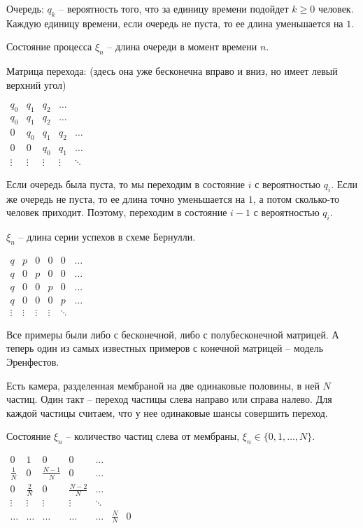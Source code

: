 \begin{exmp}
Очередь: $q_k$ -- вероятность того, что за единицу времени подойдет $k \geq 0$ человек. 
Каждую единицу времени, если очередь не пуста, то ее длина уменьшается на $1$.

Состояние процесса $\xi_n$ -- длина очереди в момент времени $n$.

Матрица перехода: (здесь она уже бесконечна вправо и вниз, но имеет левый верхний угол)

$\begin{matrix}
q_0    & q_1    & q_2    & \dots \\
q_0    & q_1    & q_2    & \dots \\
0      & q_0    & q_1    & q_2 & \dots \\
0      & 0      & q_0    & q_1 & \dots \\
\vdots & \vdots & \vdots & \vdots & \ddots
\end{matrix}$

Если очередь была пуста, то мы переходим в состояние $i$ с вероятностью $q_i$.
Если же очередь не пуста, то ее длина точно уменьшается на $1$, а потом сколько-то человек приходит.
Поэтому, переходим в состояние $i-1$ с вероятностью $q_i$.
\end{exmp}

\begin{exmp}
$\xi_n$ -- длина серии успехов в схеме Бернулли.

$\begin{matrix}
q & p & 0 & 0 & 0 & \dots  \\
q & 0 & p & 0 & 0 & \dots \\
q & 0 & 0 & p & 0 & \dots \\
q & 0 & 0 & 0 & p & \dots \\
\vdots & \vdots & \vdots & \vdots & \ddots
\end{matrix}$
\end{exmp}

\begin{exmp}
Все примеры были либо с бесконечной, либо с полубесконечной матрицей. 
А теперь один из самых известных примеров с конечной матрицей -- модель Эренфестов.

Есть камера, разделенная мембраной на две одинаковые половины, в ней $N$ частиц.
Один такт -- переход частицы слева направо или справа налево. Для каждой частицы считаем, что у нее одинаковые шансы совершить переход.

Состояние $\xi_n$ -- количество частиц слева от мембраны, $\xi_n \in \{0, 1, \dots, N\}$.

$\begin{matrix}
0            & 1            & 0                & 0               & \dots \\
\frac{1}{N}  & 0            & \frac{N - 1}{N}  & 0               & \dots \\
0            & \frac{2}{N}  & 0                & \frac{N - 2}{N} & \dots \\
\vdots       & \vdots       & \vdots           & \vdots          & \ddots\\
\dots & \dots & \dots & \dots & \dots &\frac{N}{N} & 0
\end{matrix}$
\end{exmp}

